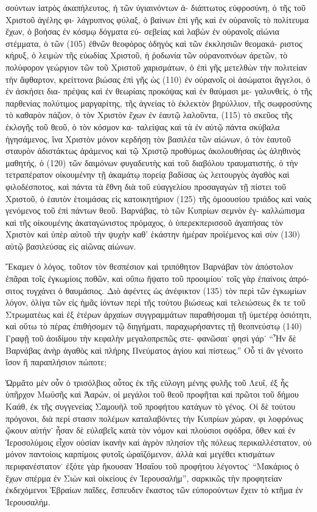 σούντων ἰατρὸς ἀκαπήλευτος, ἡ τῶν ὑγιαινόντων ἀ-
διάπτωτος εὐφροσύνη, ὁ τῆς τοῦ Χριστοῦ ἀγέλης φι-
λάγρυπνος φύλαξ, ὁ βαίνων ἐπὶ γῆς καὶ ἐν οὐρανοῖς
τὸ πολίτευμα ἔχων, ὁ βοήσας ἐν κόσμῳ δόγματα εὐ-
σεβείας καὶ λαβὼν ἐν οὐρανοῖς αἰώνια στέμματα, ὁ τῶν (105)
ἐθνῶν θεοφόρος ὁδηγὸς καὶ τῶν ἐκκλησιῶν θεομακά-
ριστος κήρυξ, ὁ λειμὼν τῆς εὐωδίας Χριστοῦ, ἡ ῥοδωνία
τῶν οὐρανοπνόων ἀρετῶν, τὸ πολύφορον γεώργιον τῶν
τοῦ Χριστοῦ χαρισμάτων, ὁ ἐπὶ γῆς μετελθὼν τὴν
πολιτείαν τὴν ἄφθαρτον, κρείττονα βιώσας ἐπὶ γῆς ὡς (110)
ἐν οὐρανοῖς οἱ ἀσώματοι ἄγγελοι, ὁ ἐν ἀσκήσει δια-
πρέψας καὶ ἐν θεωρίαις προκόψας καὶ ἐν θαύμασι με-
γαλυνθείς, ὁ τῆς παρθενίας πολύτιμος μαργαρίτης, τῆς
ἁγνείας τὸ ἐκλεκτὸν βηρύλλιον, τῆς σωφροσύνης τὸ
καθαρὸν πάζιον, ὁ τὸν Χριστὸν ἔχων ἐν ἑαυτῷ λαλοῦντα, (115)
τὸ σκεῦος τῆς ἐκλογῆς τοῦ θεοῦ, ὁ τὸν κόσμον κα-
ταλείψας καὶ τὰ ἐν αὐτῷ πάντα σκύβαλα ἡγησάμενος,
ἵνα Χριστὸν μόνον κερδήσῃ τὸν βασιλέα τῶν αἰώνων,
ὁ τὸν ἑαυτοῦ σταυρὸν ἀδιστάκτως ἀράμενος καὶ τῷ
Χριστῷ προθύμως ἀκολουθήσας ὡς ἀληθινὸς μαθητής, ὁ (120)
τῶν δαιμόνων φυγαδευτὴς καὶ τοῦ διαβόλου τραυματιστής,
ὁ τὴν τετραπέρατον οἰκουμένην τῇ ἀκαμάτῳ πορείᾳ
βαδίσας ὡς λειτουργὸς ἀγαθὸς καὶ φιλοδέσποτος, καὶ
πάντα τὰ ἔθνη διὰ τοῦ εὐαγγελίου προσαγαγὼν τῇ
πίστει τοῦ Χριστοῦ, ὁ ἑαυτὸν ἑτοιμάσας εἰς κατοικητήριον (125)
τῆς ὁμοουσίου τριάδος καὶ ναὸς γενόμενος τοῦ ἐπὶ
πάντων θεοῦ. Βαρνάβας, τὸ τῶν Κυπρίων σεμνὸν ἐγ-
καλλώπισμα καὶ τῆς οἰκουμένης ἀκαταγώνιστος πρόμαχος,
ὁ ὑπερεκπερισσοῦ ἀγαπήσας τὸν Χριστὸν καὶ ὑπὲρ αὐτοῦ
τὴν ψυχὴν καθ’ ἑκάστην ἡμέραν προϊέμενος καὶ σὺν (130)
αὐτῷ βασιλεύσας εἰς αἰῶνας αἰώνων.
  
  Ἔκαμεν ὁ λόγος, τοῦτον τὸν θεσπέσιον καὶ τριπόθητον
Βαρνάβαν τὸν ἀπόστολον ἐπᾶραι τοῖς ἐγκωμίοις ποθῶν,
καὶ οὔπω ἥψατο τοῦ προοιμίου˙ τοῖς γὰρ ἐπαίνοις ἀπρό-
σιτος τυγχάνει ὁ θαυμάσιος. Διὸ ἀφέντες ὡς ἀνέφικτον (135)
τὸν περὶ τῶν ἐγκωμίων λόγον, ὀλίγα τῶν εἰς ἡμᾶς
ἰόντων περὶ τῆς τούτου βιώσεως καὶ τελειώσεως ἔκ τε
τοῦ Στρωματέως καὶ ἐξ ἑτέρων ἀρχαίων συγγραμμάτων
παραθήσομαι τῇ ὑμετέρᾳ ὁσιότητι, καὶ οὕτω τὸ πέρας
ἐπιθήσομεν τῷ διηγήματι, παραχωρήσαντες τῇ θεοπνεύστῳ (140)
Γραφῇ τοῦ ἀοιδίμου τὴν κεφαλὴν μεγαλοπρεπῶς στε-
φανῶσαι˙ φησὶ γάρ˙ “Ἦν δὲ Βαρνάβας ἀνὴρ ἀγαθὸς καὶ
πλήρης Πνεύματος ἁγίου καὶ πίστεως.” Οὗ τί ἂν γένοιτο
ἴσον ἢ παραπλήσιον πώποτε;

\saut


Ὡρμᾶτο μὲν οὖν ὁ τρισόλβιος οὗτος ἐκ τῆς εὐλογη%
μένης φυλῆς τοῦ Λευΐ, ἐξ ἧς ὑπῆρχον Μωϋσῆς καὶ
Ἀαρών, οἱ μεγάλοι τοῦ θεοῦ προφῆται καὶ πρῶτοι τοῦ
δήμου Καάθ, ἐκ τῆς συγγενείας Σαμουὴλ τοῦ προφήτου
κατάγων τὸ γένος. Οἱ δὲ τούτου πρόγονοι, διὰ περί%
στασιν πολέμων καταλαβόντες τὴν Κυπρίων χώραν, φι%
λοφρόνως ᾤκουν αὐτήν˙ ἦσαν δὲ εὐλαβεῖς κατὰ τὸν
νόμον καὶ πλούσιοι σφόδρα, ὅθεν καὶ ἐν Ἱεροσολύμοις
εἶχον οὐσίαν ἱκανὴν καὶ ἀγρὸν πλησίον τῆς πόλεως
περικαλλέστατον, οὐ μόνον παντοίοις καρπίμοις φυτοῖς
ὡραϊζόμενον, ἀλλὰ καὶ μεγέθει κτισμάτων περιφανέστατον˙
ἐξότε γὰρ ἤκουσαν Ἡσαΐου τοῦ προφήτου λέγοντος˙
\enquote{Μακάριος ὁ ἔχων σπέρμα ἐν Σιὼν καὶ οἰκείους ἐν
Ἱερουσαλήμ}, σαρκικῶς τὴν προφητείαν ἐκδεχόμενοι
Ἑβραίων παῖδες, ἔσπευδεν ἕκαστος τῶν εὐπορούντων
ἔχειν τὸ κτῆμα ἐν Ἱερουσαλήμ.

